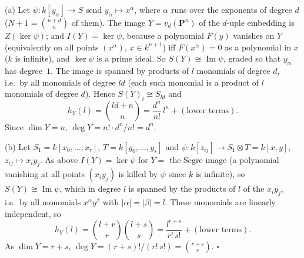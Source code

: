 \documentclass[11pt]{article}
\begin{document}
\pf
(a) Let $\psi:k[y_\alpha]\to S$ send $y_\alpha\mapsto x^\alpha$, where $\alpha$ runs over the exponents of degree $d$ ($N+1=\binom{n+d}{n}$ of them). The image $Y=v_d(\mathbf P^n)$ of the $d$-uple embedding is $Z(\ker\psi)$; and $I(Y)=\ker\psi$, because a polynomial $F(y)$ vanishes on $Y$ (equivalently on all points $(x^\alpha)$, $x\in k^{n+1}$) iff $F(x^\alpha)=0$ as a polynomial in $x$ ($k$ is infinite), and $\ker\psi$ is a prime ideal. So $S(Y)\cong\operatorname{Im}\psi$, graded so that $y_\alpha$ has degree~$1$. The image is spanned by products of $l$ monomials of degree $d$, i.e.\ by all monomials of degree $ld$ (each such monomial is a product of $l$ monomials of degree $d$). Hence $S(Y)_l\cong S_{ld}$ and
\[
h_Y(l)=\binom{ld+n}{n}=\frac{d^n}{n!}\,l^n+(\text{lower terms}).
\]
Since $\dim Y=n$, $\deg Y=n!\cdot d^n/n!=d^n$.

(b) Let $S_1=k[x_0,\dots,x_r]$, $T=k[y_0,\dots,y_s]$ and $\psi:k[z_{ij}]\to S_1\otimes T=k[x,y]$, $z_{ij}\mapsto x_iy_j$. As above $I(Y)=\ker\psi$ for $Y=$ the Segre image (a polynomial vanishing at all points $(x_iy_j)$ is killed by $\psi$ since $k$ is infinite), so $S(Y)\cong\operatorname{Im}\psi$, which in degree $l$ is spanned by the products of $l$ of the $x_iy_j$, i.e.\ by all monomials $x^\alpha y^\beta$ with $|\alpha|=|\beta|=l$. These monomials are linearly independent, so
\[
h_Y(l)=\binom{l+r}{r}\binom{l+s}{s}=\frac{l^{r+s}}{r!\,s!}+(\text{lower terms}).
\]
As $\dim Y=r+s$, $\deg Y=(r+s)!/(r!\,s!)=\binom{r+s}{r}$. \hfill$\square$
\end{document}
